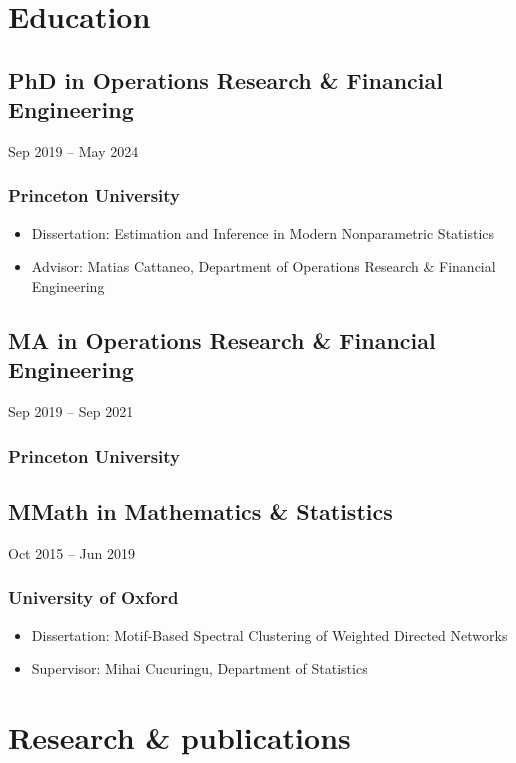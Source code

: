 \documentclass{wgu-cv}
\begin{document}
\section{Education}

\subsection{PhD in Operations Research \& Financial Engineering}
{Sep 2019 -- May 2024}
\subsubsection{Princeton University}

\begin{itemize}
  \item Dissertation:
    Estimation and Inference in Modern Nonparametric Statistics
  \item Advisor:
    Matias Cattaneo, Department of Operations Research \& Financial Engineering
\end{itemize}

\subsection{MA in Operations Research \& Financial Engineering}
{Sep 2019 -- Sep 2021}
\subsubsection{Princeton University}

\subsection{MMath in Mathematics \& Statistics}
{Oct 2015 -- Jun 2019}
\subsubsection{University of Oxford}

\begin{itemize}
  \item Dissertation:
    Motif-Based Spectral Clustering of Weighted Directed Networks
  \item Supervisor:
    Mihai Cucuringu,
    Department of Statistics
\end{itemize}

\section{Research \& publications}
\end{document}
